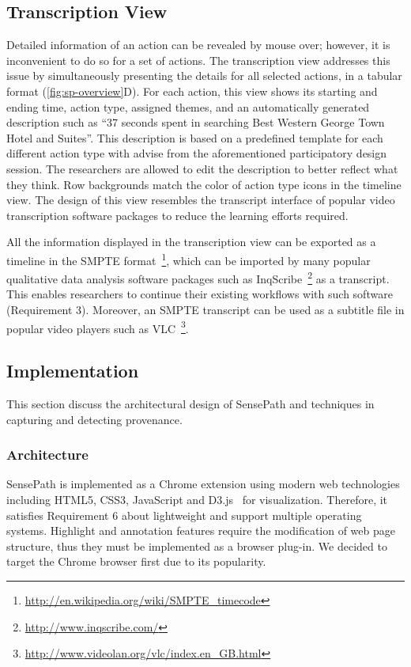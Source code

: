 \subsection{Transcription View}
Detailed information of an action can be revealed by mouse over; however, it is inconvenient to do so for a set of actions. The transcription view addresses this issue by simultaneously presenting the details for all selected actions, in a tabular format (\autoref{fig:sp-overview}D). For each action, this view shows its starting and ending time, action type, assigned themes, and an automatically generated description such as ``37 seconds spent in searching Best Western George Town Hotel and Suites''. This description is based on a predefined template for each different action type with advise from the aforementioned participatory design session. The researchers are allowed to edit the description to better reflect what they think. Row backgrounds match the color of action type icons in the timeline view. The design of this view resembles the transcript interface of popular video transcription software packages to reduce the learning efforts required.

All the information displayed in the transcription view can be exported as a timeline in the SMPTE format~\footnote{ \url{http://en.wikipedia.org/wiki/SMPTE_timecode}}, which can be imported by many popular qualitative data analysis software packages such as InqScribe~\footnote{\url{http://www.inqscribe.com/}} as a transcript. This enables researchers to continue their existing workflows with such software (Requirement 3). Moreover, an SMPTE transcript can be used as a subtitle file in popular video players such as VLC~\footnote{\url{http://www.videolan.org/vlc/index.en_GB.html}}.

\subsection{Implementation}
\label{sub:sp-impl}
This section discuss the architectural design of SensePath and techniques in capturing and detecting provenance.

\subsubsection{Architecture}
SensePath is implemented as a Chrome extension using modern web technologies including HTML5, CSS3, JavaScript and D3.js~\cite{Bostock2011} for visualization. Therefore, it satisfies Requirement 6 about lightweight and support multiple operating systems. Highlight and annotation features require the modification of web page structure, thus they must be implemented as a browser plug-in. We decided to target the Chrome browser first due to its popularity.

